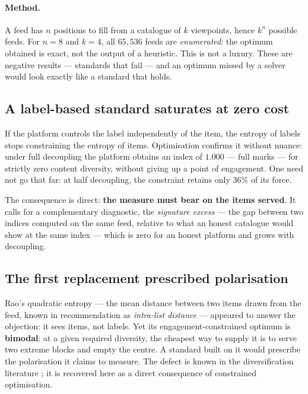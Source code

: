 \documentclass[11pt,a4paper]{article}
\begin{document}
\paragraph{Method.} A feed has $n$ positions to fill from a catalogue of $k$ viewpoints, hence
$k^n$ possible feeds. For $n = 8$ and $k = 4$, all $65{,}536$ feeds are \emph{enumerated}: the
optimum obtained is exact, not the output of a heuristic. This is not a luxury. These are
negative results --- standards that fail --- and an optimum missed by a solver would look
exactly like a standard that holds.

\subsection{A label-based standard saturates at zero cost}

If the platform controls the label independently of the item, the entropy of labels stops
constraining the entropy of items. Optimisation confirms it without nuance: under full
decoupling the platform obtains an index of $1.000$ --- full marks --- for strictly zero content
diversity, without giving up a point of engagement. One need not go that far: at half
decoupling, the constraint retains only $36\%$ of its force.

The consequence is direct: \textbf{the measure must bear on the items served}. It calls for a
complementary diagnostic, the \emph{signature excess} --- the gap between two indices computed
on the same feed, relative to what an honest catalogue would show at the same index --- which is
zero for an honest platform and grows with decoupling.

\subsection{The first replacement prescribed polarisation}

Rao's quadratic entropy \citep{rao1982} --- the mean distance between two items drawn from the
feed, known in recommendation as \emph{intra-list distance} --- appeared to answer the
objection: it sees items, not labels. Yet its engagement-constrained optimum is
\textbf{bimodal}: at a given required diversity, the cheapest way to supply it is to serve two
extreme blocks and empty the centre. A standard built on it would prescribe the polarisation it
claims to measure. The defect is known in the diversification literature
\citep{ohsaka2023}; it is recovered here as a direct consequence of constrained optimisation.
\end{document}

